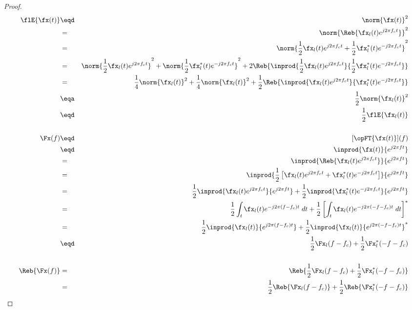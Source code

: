 \begin{proof} \\

\begin{eqnarray*}
   \flE{\fx(t)}
        &\eqd& \norm{\fx(t)}^2
      \\&=&    \norm{\Reb{ \fx_l(t)e^{j2\pi f_ct}}}^2
      \\&=&    \norm{\frac{1}{2}\fx_l(t)e^{j2\pi f_ct} + \frac{1}{2}\fx_l^\ast(t)e^{-j2\pi f_ct} }^2
      \\&=&    \norm{ \frac{1}{2}\fx_l(t)e^{j2\pi f_ct} }^2
          +    \norm{ \frac{1}{2}\fx_l^\ast(t)e^{-j2\pi f_ct} }^2
          +    2\Reb{\inprod{\frac{1}{2}\fx_l(t)e^{j2\pi f_ct}}{\frac{1}{2}\fx_l^\ast(t)e^{-j2\pi f_ct}}}
      \\&=&    \frac{1}{4}\norm{ \fx_l(t) }^2
          +    \frac{1}{4}\norm{ \fx_l(t) }^2
          +    \frac{1}{2}\Reb{\inprod{\fx_l(t)e^{j2\pi f_ct}}{\fx_l^\ast(t)e^{-j2\pi f_ct}}}
      \\&\eqa& \frac{1}{2}\norm{ \fx_l(t) }^2
      \\&\eqd& \frac{1}{2}\flE{\fx_l(t)}
\\ \\
   \Fx(f)
        &\eqd& [\opFT{\fx(t)}](f)
      \\&\eqd& \inprod{\fx(t)}{e^{j2\pi ft}}
      \\&=   & \inprod{\Reb{ \fx_l(t)e^{j2\pi f_ct}}}
                            {e^{j2\pi ft}}
      \\&=   & \inprod{\frac{1}{2}\left[ \fx_l(t)e^{j2\pi f_ct} + \fx_l^\ast(t)e^{-j2\pi f_ct}   \right]}
                            {e^{j2\pi ft}}
      \\&=   & \frac{1}{2} \inprod{\fx_l(t)     e^{ j2\pi f_ct}}{ e^{j2\pi ft}}
             + \frac{1}{2} \inprod{\fx_l^\ast(t)e^{-j2\pi f_ct}}{ e^{j2\pi ft}}
      \\&=&    \frac{1}{2} \int_t  \fx_l(t)e^{-j2\pi(f-f_c)t}  \; dt
          +    \frac{1}{2} \left[ \int_t  \fx_l(t) e^{-j2\pi(- f-f_c)t} \; dt \right]^\ast
      \\&=&    \frac{1}{2} \inprod{\fx_l(t)}{e^{j2\pi(f-f_c)t}}
          +    \frac{1}{2} \inprod{\fx_l(t)}{e^{j2\pi(- f-f_c)t}}^\ast
      \\&\eqd& \frac{1}{2}\Fx_l(f-f_c) + \frac{1}{2}\Fx_l^\ast(-f-f_c)
\\ \\
   \Reb{\Fx(f)}
     &=& \Reb{\frac{1}{2}\Fx_l(f-f_c) + \frac{1}{2}\Fx_l^\ast(-f-f_c)}
   \\&=& \frac{1}{2}\Reb{\Fx_l(f-f_c)} + \frac{1}{2}\Reb{\Fx_l^\ast(-f-f_c)}

\end{eqnarray*}
\end{proof}
